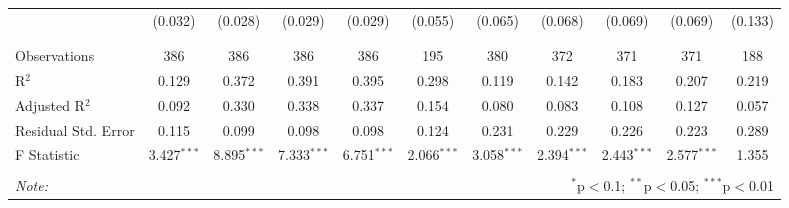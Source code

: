 \begin{table}[H]
\begin{tabular}{@{\extracolsep{4pt}}lcccccccccc}
  & (0.032) & (0.028) & (0.029) & (0.029) & (0.055) & (0.065) & (0.068) & (0.069) & (0.069) & (0.133) \\ 
  & & & & & & & & & & \\ 
\hline \\[-1.8ex] 
Observations & 386 & 386 & 386 & 386 & 195 & 380 & 372 & 371 & 371 & 188 \\ 
R$^{2}$ & 0.129 & 0.372 & 0.391 & 0.395 & 0.298 & 0.119 & 0.142 & 0.183 & 0.207 & 0.219 \\ 
Adjusted R$^{2}$ & 0.092 & 0.330 & 0.338 & 0.337 & 0.154 & 0.080 & 0.083 & 0.108 & 0.127 & 0.057 \\ 
Residual Std. Error & 0.115 & 0.099 & 0.098 & 0.098 & 0.124 & 0.231 & 0.229 & 0.226 & 0.223 & 0.289 \\ 
F Statistic & 3.427$^{***}$ & 8.895$^{***}$ & 7.333$^{***}$ & 6.751$^{***}$ & 2.066$^{***}$ & 3.058$^{***}$ & 2.394$^{***}$ & 2.443$^{***}$ & 2.577$^{***}$ & 1.355 \\ 
\hline 
\hline \\[-1.8ex] 
\textit{Note:}  & \multicolumn{10}{r}{$^{*}$p$<$0.1; $^{**}$p$<$0.05; $^{***}$p$<$0.01} \\ 
\end{tabular} 
\end{table} 
